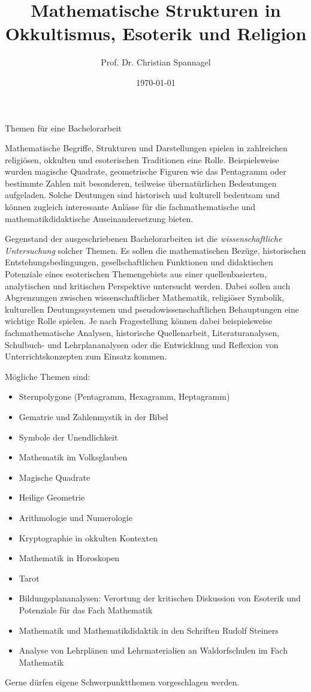 \documentclass{cssheet}
\title{Mathematische Strukturen in Okkultismus, Esoterik und Religion}
\author{Prof. Dr. Christian Spannagel}
\date{\today}
\begin{document}
\vspace*{5mm}
\begin{center}
{\Large Themen für eine Bachelorarbeit}
\end{center}

\printtitle
\vspace*{1cm}

Mathematische Begriffe, Strukturen und Darstellungen spielen in zahlreichen religiösen, okkulten und esoterischen Traditionen eine Rolle. Beispielsweise wurden magische Quadrate, geometrische Figuren wie das Pentagramm oder bestimmte Zahlen mit besonderen, teilweise übernatürlichen Bedeutungen aufgeladen. Solche Deutungen sind historisch und kulturell bedeutsam und können zugleich interessante Anlässe für die fachmathematische und mathematikdidaktische Auseinandersetzung bieten.

Gegenstand der ausgeschriebenen Bachelorarbeiten ist die \emph{wissenschaftliche Untersuchung} solcher Themen. Es sollen die mathematischen Bezüge, historischen Entstehungsbedingungen, gesell\-schaft\-li\-chen Funktionen und didaktischen Potenziale eines esoterischen Themengebiets aus einer quellenbasierten, analytischen und kritischen Perspektive untersucht werden. Dabei sollen auch Abgrenzungen zwischen wissenschaftlicher Mathematik, religiöser Symbolik, kulturellen Deutungssystemen und pseudowissenschaftlichen Behauptungen eine wichtige Rolle spielen. Je nach Fragestellung können dabei beispielsweise fachmathematische Analysen, historische Quellenarbeit, Literaturanalysen, Schulbuch- und Lehrplananalysen oder die Entwicklung und Reflexion von Unterrichtskonzepten zum Einsatz kommen.

Mögliche Themen sind:
\begin{itemize}
\item Sternpolygone (Pentagramm, Hexagramm, Heptagramm)
\item Gematrie und Zahlenmystik in der Bibel
\item Symbole der Unendlichkeit
\item Mathematik im Volksglauben
\item Magische Quadrate
\item Heilige Geometrie
\item Arithmologie und Numerologie
\item Kryptographie in okkulten Kontexten
\item Mathematik in Horoskopen
\item Tarot
\item Bildungsplananalysen: Verortung der kritischen Diskussion von Esoterik und Potenziale für das Fach Mathematik
\item Mathematik und Mathematikdidaktik in den Schriften Rudolf Steiners
\item Analyse von Lehrplänen und Lehrmaterialien an Waldorfschulen im Fach Mathematik
\end{itemize}

Gerne dürfen eigene Schwerpunktthemen vorgeschlagen werden.

\vspace*{10mm}

\printlicense
\end{document}
